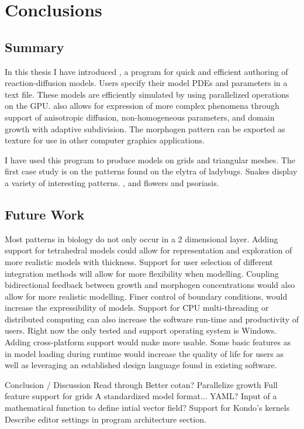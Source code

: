 \chapter{Conclusions}
\section{Summary}


In this thesis I have introduced \ProgramName{}, a program for quick and efficient authoring of reaction-diffusion models. Users specify their model PDEs and parameters in a text file. These models are efficiently simulated by using parallelized operations on the GPU. \ProgramName{} also allows for expression of more complex phenomena through support of anisotropic diffusion, non-homogeneous parameters, and domain growth with adaptive subdivision. The morphogen pattern can be exported as texture for use in other computer graphics applications.

I have used this program to produce models on grids and triangular meshes. The first case study is on the patterns found on the elytra of ladybugs. Snakes display a variety of interesting patterns. , and flowers and psoriasis.

\section{Future Work}
Most patterns in biology do not only occur in a 2 dimensional layer. Adding support for tetrahedral models could allow for representation and exploration of more realistic models with thickness. Support for user selection of different integration methods will allow for more flexibility when modelling. Coupling bidirectional feedback between growth and morphogen concentrations would also allow for more realistic modelling. Finer control of boundary conditions, would increase the expressibility of models. Support for CPU multi-threading or distributed computing can also increase the software run-time and productivity of users. Right now the only tested and support operating system is Windows. Adding cross-platform support would make \ProgramName{} more usable. Some basic features as in model loading during runtime would increase the quality of life for users as well as leveraging an established design language found in existing software.

Conclusion / Discussion
	Read through
	Better cotan?
	Parallelize growth
	Full feature support for grids
	A standardized model format... YAML?
	Input of a mathematical function to define intial vector field?
	Support for Kondo's kernels
	Describe editor settings in program architecture section.